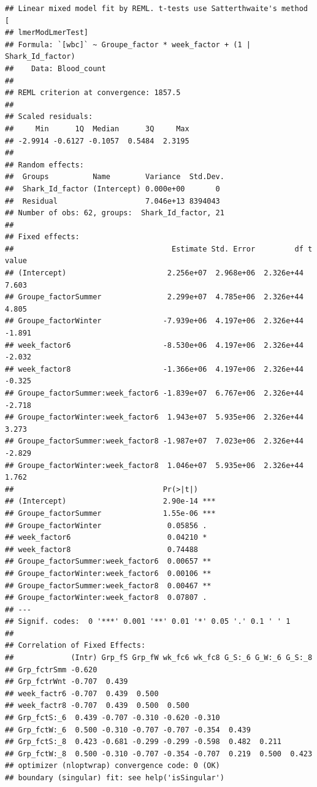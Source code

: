 \documentclass[
]{article}
\begin{document}
\begin{verbatim}
## Linear mixed model fit by REML. t-tests use Satterthwaite's method [
## lmerModLmerTest]
## Formula: `[wbc]` ~ Groupe_factor * week_factor + (1 | Shark_Id_factor)
##    Data: Blood_count
## 
## REML criterion at convergence: 1857.5
## 
## Scaled residuals: 
##     Min      1Q  Median      3Q     Max 
## -2.9914 -0.6127 -0.1057  0.5484  2.3195 
## 
## Random effects:
##  Groups          Name        Variance  Std.Dev.
##  Shark_Id_factor (Intercept) 0.000e+00       0 
##  Residual                    7.046e+13 8394043 
## Number of obs: 62, groups:  Shark_Id_factor, 21
## 
## Fixed effects:
##                                    Estimate Std. Error         df t value
## (Intercept)                       2.256e+07  2.968e+06  2.326e+44   7.603
## Groupe_factorSummer               2.299e+07  4.785e+06  2.326e+44   4.805
## Groupe_factorWinter              -7.939e+06  4.197e+06  2.326e+44  -1.891
## week_factor6                     -8.530e+06  4.197e+06  2.326e+44  -2.032
## week_factor8                     -1.366e+06  4.197e+06  2.326e+44  -0.325
## Groupe_factorSummer:week_factor6 -1.839e+07  6.767e+06  2.326e+44  -2.718
## Groupe_factorWinter:week_factor6  1.943e+07  5.935e+06  2.326e+44   3.273
## Groupe_factorSummer:week_factor8 -1.987e+07  7.023e+06  2.326e+44  -2.829
## Groupe_factorWinter:week_factor8  1.046e+07  5.935e+06  2.326e+44   1.762
##                                  Pr(>|t|)    
## (Intercept)                      2.90e-14 ***
## Groupe_factorSummer              1.55e-06 ***
## Groupe_factorWinter               0.05856 .  
## week_factor6                      0.04210 *  
## week_factor8                      0.74488    
## Groupe_factorSummer:week_factor6  0.00657 ** 
## Groupe_factorWinter:week_factor6  0.00106 ** 
## Groupe_factorSummer:week_factor8  0.00467 ** 
## Groupe_factorWinter:week_factor8  0.07807 .  
## ---
## Signif. codes:  0 '***' 0.001 '**' 0.01 '*' 0.05 '.' 0.1 ' ' 1
## 
## Correlation of Fixed Effects:
##             (Intr) Grp_fS Grp_fW wk_fc6 wk_fc8 G_S:_6 G_W:_6 G_S:_8
## Grp_fctrSmm -0.620                                                 
## Grp_fctrWnt -0.707  0.439                                          
## week_factr6 -0.707  0.439  0.500                                   
## week_factr8 -0.707  0.439  0.500  0.500                            
## Grp_fctS:_6  0.439 -0.707 -0.310 -0.620 -0.310                     
## Grp_fctW:_6  0.500 -0.310 -0.707 -0.707 -0.354  0.439              
## Grp_fctS:_8  0.423 -0.681 -0.299 -0.299 -0.598  0.482  0.211       
## Grp_fctW:_8  0.500 -0.310 -0.707 -0.354 -0.707  0.219  0.500  0.423
## optimizer (nloptwrap) convergence code: 0 (OK)
## boundary (singular) fit: see help('isSingular')
\end{verbatim}
\end{document}
